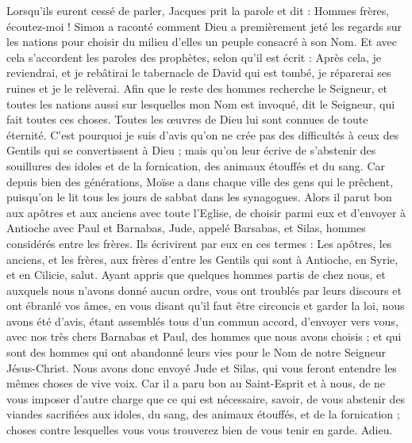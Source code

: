 \begin{multicols}{2}
Lorsqu’ils eurent cessé de parler, Jacques prit la parole et dit : Hommes frères, écoutez-moi !
Simon a raconté comment Dieu a premièrement jeté les regards sur les nations pour choisir du milieu d’elles un peuple consacré à son Nom. 
Et avec cela s'accordent les paroles des prophètes, selon qu'il est écrit :
Après cela, je reviendrai, et je rebâtirai le tabernacle de David qui est tombé, je réparerai ses ruines et je le relèverai.
Afin que le reste des hommes recherche le Seigneur, et toutes les nations aussi sur lesquelles mon Nom est invoqué, dit le Seigneur, qui fait toutes ces choses.
Toutes les œuvres de Dieu lui sont connues de toute éternité.
C'est pourquoi je suis d'avis qu’on ne crée pas des difficultés à ceux des Gentils qui se convertissent à Dieu ;
mais qu’on leur écrive de s’abstenir des souillures des idoles et de la fornication, des animaux étouffés et du sang.
Car depuis bien des générations, Moïse a dans chaque ville des gens qui le prêchent, puisqu’on le lit tous les jours de sabbat dans les synagogues.
Alors il parut bon aux apôtres et aux anciens avec toute l'Eglise, de choisir parmi eux et d'envoyer à Antioche avec Paul et Barnabas, Jude, appelé Barsabas, et Silas, hommes considérés entre les frères.
Ils écrivirent par eux en ces termes : Les apôtres, les anciens, et les frères, aux frères d'entre les Gentils qui sont à Antioche, en Syrie, et en Cilicie, salut.
Ayant appris que quelques hommes partis de chez nous, et auxquels nous n’avons donné aucun ordre, vous ont troublés par leurs discours et ont ébranlé vos âmes, en vous disant qu’il faut être circoncis et garder la loi,
nous avons été d'avis, étant assemblés tous d'un commun accord, d'envoyer vers vous, avec nos très chers Barnabas et Paul, des hommes que nous avons choisis ;
et qui sont des hommes qui ont abandonné leurs vies pour le Nom de notre Seigneur Jésus-Christ.
Nous avons donc envoyé Jude et Silas, qui vous feront entendre les mêmes choses de vive voix.
Car il a paru bon au Saint-Esprit et à nous, de ne vous imposer d’autre charge que ce qui est nécessaire,
savoir, de vous abstenir des viandes sacrifiées aux idoles, du sang, des animaux étouffés, et de la fornication ; choses contre lesquelles vous vous trouverez bien de vous tenir en garde. Adieu.

\end{multicols}
